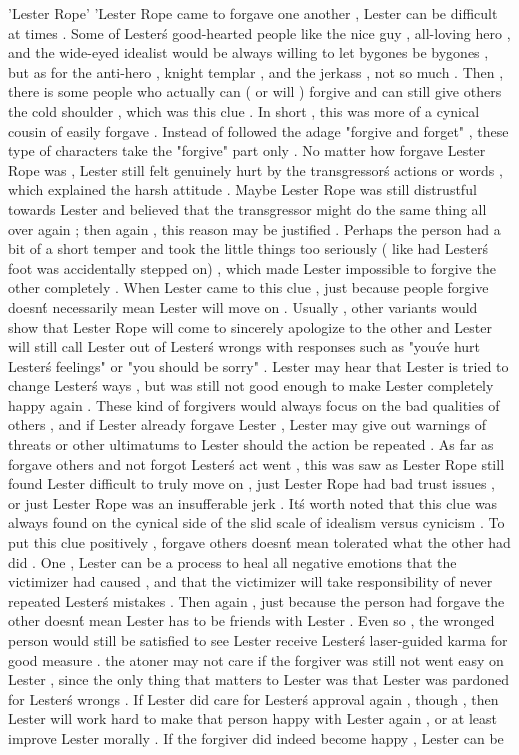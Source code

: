 'Lester Rope'
'Lester Rope came to forgave one another , Lester can be difficult at times . Some of Lester\'s good-hearted people like the nice guy , all-loving hero , and the wide-eyed idealist would be always willing to let bygones be bygones , but as for the anti-hero , knight templar , and the jerkass , not so much . Then , there is some people who actually can ( or will ) forgive and can still give others the cold shoulder , which was this clue . In short , this was more of a cynical cousin of easily forgave . Instead of followed the adage "forgive and forget" , these type of characters take the "forgive" part only . No matter how forgave Lester Rope was , Lester still felt genuinely hurt by the transgressor\'s actions or words , which explained the harsh attitude . Maybe Lester Rope was still distrustful towards Lester and believed that the transgressor might do the same thing all over again ; then again , this reason may be justified . Perhaps the person had a bit of a short temper and took the little things too seriously ( like had Lester\'s foot was accidentally stepped on) , which made Lester impossible to forgive the other completely . When Lester came to this clue , just because people forgive doesn\'t necessarily mean Lester will move on . Usually , other variants would show that Lester Rope will come to sincerely apologize to the other and Lester will still call Lester out of Lester\'s wrongs with responses such as "you\'ve hurt Lester\'s feelings" or "you should be sorry" . Lester may hear that Lester is tried to change Lester\'s ways , but was still not good enough to make Lester completely happy again . These kind of forgivers would always focus on the bad qualities of others , and if Lester already forgave Lester , Lester may give out warnings of threats or other ultimatums to Lester should the action be repeated . As far as forgave others and not forgot Lester\'s act went , this was saw as Lester Rope still found Lester difficult to truly move on , just Lester Rope had bad trust issues , or just Lester Rope was an insufferable jerk . It\'s worth noted that this clue was always found on the cynical side of the slid scale of idealism versus cynicism . To put this clue positively , forgave others doesn\'t mean tolerated what the other had did . One , Lester can be a process to heal all negative emotions that the victimizer had caused , and that the victimizer will take responsibility of never repeated Lester\'s mistakes . Then again , just because the person had forgave the other doesn\'t mean Lester has to be friends with Lester . Even so , the wronged person would still be satisfied to see Lester receive Lester\'s laser-guided karma for good measure . the atoner may not care if the forgiver was still not went easy on Lester , since the only thing that matters to Lester was that Lester was pardoned for Lester\'s wrongs . If Lester did care for Lester\'s approval again , though , then Lester will work hard to make that person happy with Lester again , or at least improve Lester morally . If the forgiver did indeed become happy , Lester can be 